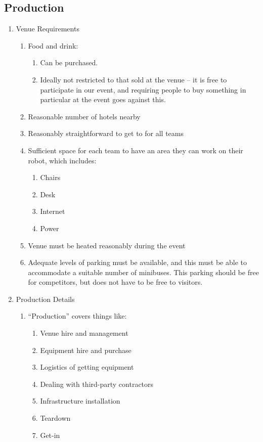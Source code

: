 \subsection{Production}
\begin{enumerate}
\item Venue Requirements
    \begin{enumerate}
    \item Food and drink:
      \begin{enumerate}
      \item Can be purchased.
      \item Ideally not restricted to that sold at the venue -- it is free to participate in our event, and requiring people to buy something in particular at the event goes against this.
      \end{enumerate}
    \item Reasonable number of hotels nearby
    \item Reasonably straightforward to get to for all teams
    \item Sufficient space for each team to have an area they can work on their robot, which includes:
      \begin{enumerate}
      \item Chairs
      \item Desk
      \item Internet
      \item Power
      \end{enumerate}
    \item Venue must be heated reasonably during the event
    \item Adequate levels of parking must be available, and this must be able to accommodate a suitable number of minibuses.  This parking should be free for competitors, but does not have to be free to visitors. 
    \end{enumerate}

\item Production Details
  \begin{enumerate}
  \item ``Production'' covers things like:
    \begin{enumerate}
    \item Venue hire and management
    \item Equipment hire and purchase
    \item Logistics of getting equipment
    \item Dealing with third-party contractors
    \item Infrastructure installation
    \item Teardown
    \item Get-in
    \end{enumerate}


\end{enumerate}
\end{enumerate}
